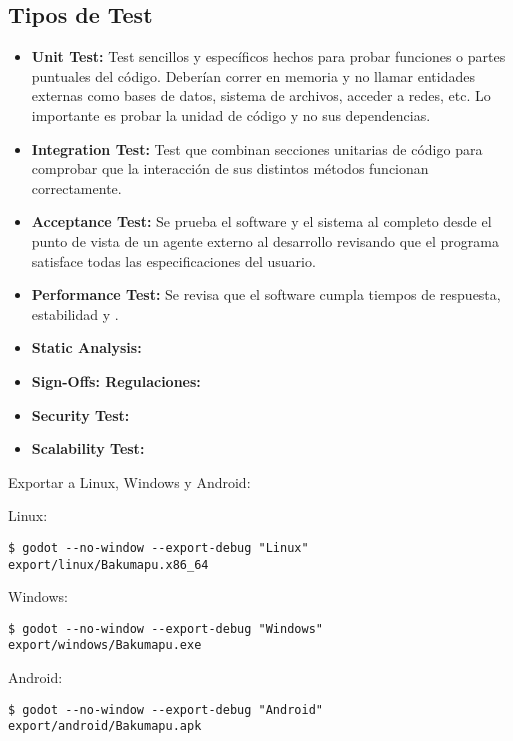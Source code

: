 
\subsection{Tipos de Test}\label{pipeline:tipos-de-test}

\begin{itemize}
  \item \textbf{Unit Test:} Test sencillos y específicos hechos para probar
      funciones o partes puntuales del código. Deberían correr en memoria y no
      llamar entidades externas como bases de datos, sistema de archivos,
      acceder a redes, etc. Lo importante es probar la unidad de código y no
      sus dependencias. \item \textbf{Integration Test:} Test que combinan
      secciones unitarias de código para comprobar que la interacción de sus
      distintos métodos funcionan correctamente.
  \item \textbf{Acceptance Test:} Se prueba el software y el sistema al
      completo desde el punto de vista de un agente externo al desarrollo
      revisando que el programa satisface todas las especificaciones del
      usuario. \item \textbf{Performance Test:} Se revisa que el software
      cumpla tiempos de respuesta, estabilidad y .
  \item \textbf{Static Analysis:} 
  \item \textbf{Sign-Offs: Regulaciones:} 
  \item \textbf{Security Test:} 
  \item \textbf{Scalability Test:} 
\end{itemize}


Exportar a Linux, Windows y Android:

Linux:
\begin{lstlisting}
$ godot --no-window --export-debug "Linux" export/linux/Bakumapu.x86_64
\end{lstlisting}

Windows:
\begin{lstlisting}
$ godot --no-window --export-debug "Windows" export/windows/Bakumapu.exe
\end{lstlisting}

Android:
\begin{lstlisting}
$ godot --no-window --export-debug "Android" export/android/Bakumapu.apk
\end{lstlisting}
